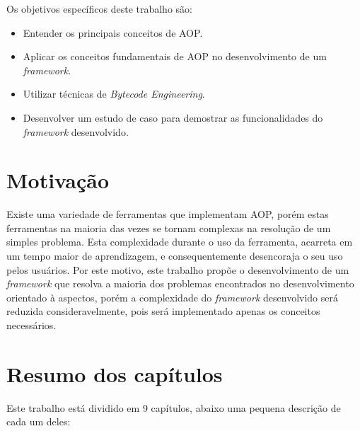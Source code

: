\documentclass[tc,openright]{iiufrgs}
\begin{document}
Os objetivos específicos deste trabalho são: 

\begin{itemize}
\item Entender os principais conceitos de AOP.
\item Aplicar os conceitos fundamentais de AOP no desenvolvimento de um \textit{framework}.
\item Utilizar técnicas de \textit{Bytecode Engineering}.
\item Desenvolver um estudo de caso para demostrar as funcionalidades do \textit{framework} desenvolvido.
\end{itemize}

\section{Motivação}

Existe uma variedade de ferramentas que implementam AOP, porém estas ferramentas na maioria das vezes se tornam complexas na resolução de um simples problema. Esta complexidade durante o uso da ferramenta, acarreta em um tempo maior de aprendizagem, e consequentemente desencoraja o seu uso pelos usuários. Por este motivo, este trabalho propõe o desenvolvimento de um \textit{framework} que resolva a maioria dos problemas encontrados no desenvolvimento orientado à aspectos, porém a complexidade do \textit{framework} desenvolvido será reduzida consideravelmente, pois será implementado apenas os conceitos necessários.

\section{Resumo dos capítulos}

Este trabalho está dividido em 9 capítulos, abaixo uma pequena descrição de cada um deles:
\end{document}
